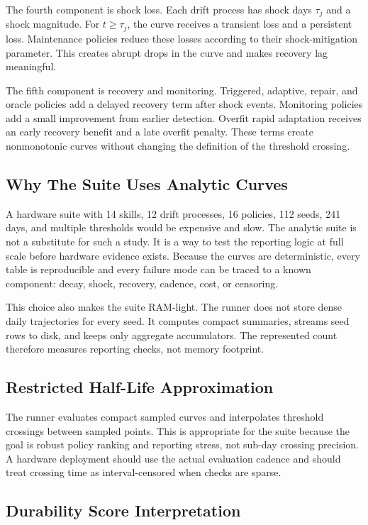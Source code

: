\documentclass{article}
\begin{document}
The fourth component is shock loss. Each drift process has shock days
$\tau_j$ and a shock magnitude. For $t\geq \tau_j$, the curve receives a
transient loss and a persistent loss. Maintenance policies reduce these losses
according to their shock-mitigation parameter. This creates abrupt drops in the
curve and makes recovery lag meaningful.

The fifth component is recovery and monitoring. Triggered, adaptive, repair,
and oracle policies add a delayed recovery term after shock events. Monitoring
policies add a small improvement from earlier detection. Overfit rapid
adaptation receives an early recovery benefit and a late overfit penalty. These
terms create nonmonotonic curves without changing the definition of the
threshold crossing.

\subsection{Why The Suite Uses Analytic Curves}

A hardware suite with 14 skills, 12 drift processes, 16 policies, 112 seeds,
241 days, and multiple thresholds would be expensive and slow. The analytic
suite is not a substitute for such a study. It is a way to test the reporting
logic at full scale before hardware evidence exists. Because the curves are
deterministic, every table is reproducible and every failure mode can be traced
to a known component: decay, shock, recovery, cadence, cost, or censoring.

This choice also makes the suite RAM-light. The runner does not store dense
daily trajectories for every seed. It computes compact summaries, streams seed
rows to disk, and keeps only aggregate accumulators. The represented count
therefore measures reporting checks, not memory footprint.

\subsection{Restricted Half-Life Approximation}

The runner evaluates compact sampled curves and interpolates threshold
crossings between sampled points. This is appropriate for the suite because the
goal is robust policy ranking and reporting stress, not sub-day crossing
precision. A hardware deployment should use the actual evaluation cadence and
should treat crossing time as interval-censored when checks are sparse.

\subsection{Durability Score Interpretation}
\end{document}

